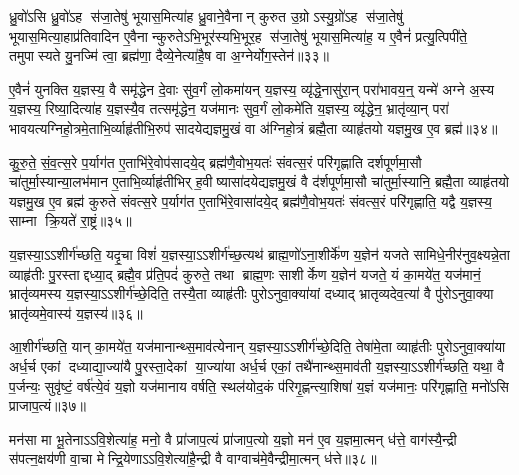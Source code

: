 ध्रु॒वो॑ऽसि ध्रु॒वो॑ऽह स॑जा॒तेषु॑ भूयास॒मित्या॑ह ध्रु॒वाने॒वैनान् कुरुत उ॒ग्रोऽस्यु॒ग्रो॑ऽह स॑जा॒तेषु॑ भूयास॒मित्या॒हाप्र॑तिवादिन ए॒वैनान्कुरुतेऽभि॒भूर॑स्यभि॒भूर॒ह स॑जा॒तेषु॑ भूयास॒मित्या॑ह॒ य ए॒वैनं॑ प्रत्यु॒त्पिपी॑ते॒ तमुपास्यते यु॒नज्मि॑ त्वा॒ ब्रह्म॑णा॒ दैव्ये॒नेत्या॑है॒ष वा अ॒ग्नेर्योग॒स्तेन॑॥३३॥

ए॒वैनं॑ युनक्ति य॒ज्ञस्य॒ वै समृ॑द्धेन दे॒वाः सु॑व॒र्गं लो॒कमा॑यन् य॒ज्ञस्य॒ व्यृ॑द्धे॒नासु॑रा॒न् परा॑भावय॒न्॒ यन्मे॑ अग्ने अ॒स्य य॒ज्ञस्य॒ रिष्या॒दित्या॑ह य॒ज्ञस्यै॒व तत्समृ॑द्धेन॒ यज॑मानः सुव॒र्गं लो॒कमे॑ति य॒ज्ञस्य॒ व्यृ॑द्धेन॒ भ्रातृ॑व्या॒न् परा॑ भावयत्यग्निहो॒त्रमे॒ताभि॒र्व्याहृ॑तीभि॒रुप॑ सादयेद्यज्ञमु॒खं वा अ॑ग्निहो॒त्रं ब्रह्मै॒ता व्याहृ॑तयो यज्ञमु॒ख ए॒व ब्रह्म॑॥३४॥

कु॒रु॒ते॒ सं॒व॒त्स॒रे प॒र्याग॑त ए॒ताभि॑रे॒वोप॑सादये॒द् ब्रह्म॑णै॒वोभ॒यतः॑ संवत्स॒रं परि॑गृह्णाति दर्\mbox{}शपूर्णमा॒सौ चा॑तुर्मा॒स्यान्या॒लभ॑मान ए॒ताभि॒र्व्याहृ॑तीभिर्\mbox{} ह॒वीष्यासा॑दयेद्यज्ञमु॒खं वै द॑र्\mbox{}शपूर्णमा॒सौ चा॑तुर्मा॒स्यानि॒ ब्रह्मै॒ता व्याहृ॑तयो यज्ञमु॒ख ए॒व ब्रह्म॑ कुरुते संवत्स॒रे प॒र्याग॑त ए॒ताभि॑रे॒वासा॑दये॒द् ब्रह्म॑णै॒वोभ॒यतः॑ संवत्स॒रं परि॑गृह्णाति॒ यद्वै य॒ज्ञस्य॒ साम्ना क्रि॒यते॑ रा॒ष्ट्रं॥३५॥

य॒ज्ञस्या॒ऽऽशीर्ग॑च्छति॒ यदृ॒चा विशं॑ य॒ज्ञस्या॒ऽऽशीर्ग॑च्छ॒त्यथ॑ ब्राह्म॒णो॑ऽना॒शीर्के॑ण य॒ज्ञेन॑ यजते सामिधे॒नीर॑नुव॒क्ष्यन्ने॒ता व्याहृ॑तीः पु॒रस्ताद्दध्या॒द् ब्रह्मै॒व प्र॑ति॒पदं॑ कुरुते॒ तथा ब्राह्म॒णः साशीर्केण य॒ज्ञेन॑ यजते॒ यं का॒मये॑त॒ यज॑मानं॒ भ्रातृ॑व्यमस्य य॒ज्ञस्या॒ऽऽशीर्ग॑च्छे॒दिति॒ तस्यै॒ता व्याहृ॑तीः पुरोऽनुवा॒क्या॑यां दध्याद् भ्रातृव्यदेव॒त्या॑ वै पु॑रोऽनुवा॒क्या भ्रातृ॑व्यमे॒वास्य॑ य॒ज्ञस्य॑॥३६॥

आ॒शीर्ग॑च्छति॒ यान् का॒मये॑त॒ यज॑मानान्थ्स॒माव॑त्येनान् य॒ज्ञस्या॒ऽऽशीर्ग॑च्छे॒दिति॒ तेषा॑मे॒ता व्याहृ॑तीः पुरोऽनुवा॒क्या॑या अर्ध॒र्च एकां दध्याद्या॒ज्या॑यै पु॒रस्ता॒देकां या॒ज्या॑या अर्ध॒र्च एकां॒ तथै॑नान्थ्स॒माव॑ती य॒ज्ञस्या॒ऽऽशीर्ग॑च्छति॒ यथा॒ वै प॒र्जन्यः॒ सुवृ॑ष्टं॒ वर्\mbox{}ष॑त्ये॒वं य॒ज्ञो यज॑मानाय वर्\mbox{}षति॒ स्थल॑योद॒कं प॑रिगृ॒ह्णन्त्या॒शिषा॑ य॒ज्ञं यज॑मानः॒ परि॑गृह्णाति॒ मनो॑ऽसि प्राजाप॒त्यं॥३७॥

मन॑सा मा भू॒तेनाऽऽवि॒शेत्या॑ह॒ मनो॒ वै प्रा॑जाप॒त्यं प्रा॑जाप॒त्यो य॒ज्ञो मन॑ ए॒व य॒ज्ञमा॒त्मन् ध॑त्ते॒ वाग॑स्यै॒न्द्री स॑पत्न॒क्षय॑णी वा॒चा मेन्द्रि॒येणाऽऽवि॒शेत्या॑है॒न्द्री वै वाग्वाच॑मे॒वैन्द्रीमा॒त्मन् ध॑त्ते॥३८॥

{\anuvakamend[{तेनै॒व ब्रह्म॑ रा॒ष्ट्रमे॒वास्य॑ य॒ज्ञस्य॑ प्राजाप॒त्य षट्त्रिꣳ॑शच्च॥10॥}]}

